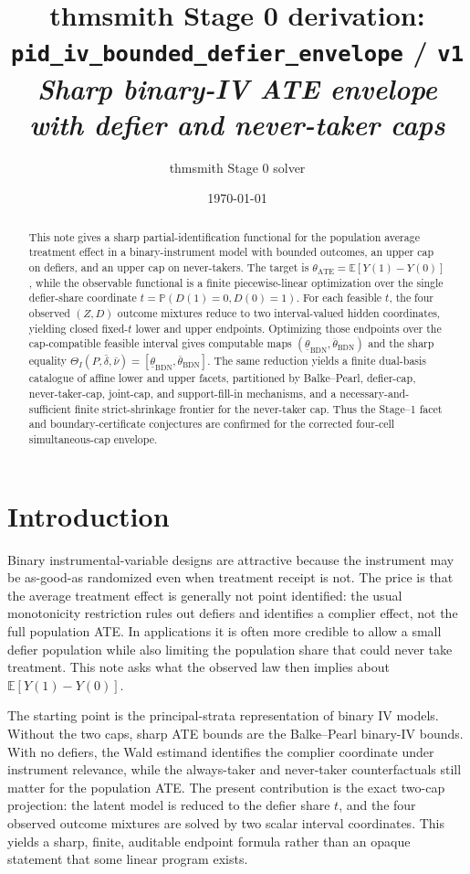 \documentclass[11pt]{article}
\title{thmsmith Stage 0 derivation: \texttt{pid\_iv\_bounded\_defier\_envelope} / \texttt{v1}%
  \\ \large\textit{Sharp binary-IV ATE envelope with defier and never-taker caps}}
\author{thmsmith Stage 0 solver}
\date{\today}
\newcommand{\E}{\mathbb{E}}
\renewcommand{\Pr}{\mathbb{P}}
\theoremstyle{definition}
\theoremstyle{plain}
\theoremstyle{remark}
\begin{document}
\maketitle


\begin{abstract}
This note gives a sharp partial-identification functional for the population
average treatment effect in a binary-instrument model with bounded outcomes,
an upper cap on defiers, and an upper cap on never-takers.  The target is
\(\theta_{\mathrm{ATE}}=\E[Y(1)-Y(0)]\), while the observable functional is a
finite piecewise-linear optimization over the single defier-share coordinate
\(t=\Pr(D(1)=0,D(0)=1)\).  For each feasible \(t\), the four observed
\((Z,D)\) outcome mixtures reduce to two interval-valued hidden coordinates,
yielding closed fixed-\(t\) lower and upper endpoints.  Optimizing those
endpoints over the cap-compatible feasible interval gives computable maps
\((\underline\theta_{\mathrm{BDN}},\overline\theta_{\mathrm{BDN}})\) and the
sharp equality
\(\Theta_I(P,\bar\delta,\bar\nu)=
[\underline\theta_{\mathrm{BDN}},\overline\theta_{\mathrm{BDN}}]\).  The same
reduction yields a finite dual-basis catalogue of affine lower and upper
facets, partitioned by Balke--Pearl, defier-cap, never-taker-cap, joint-cap,
and support-fill-in mechanisms, and a necessary-and-sufficient finite
strict-shrinkage frontier for the never-taker cap.  Thus the Stage--1 facet
and boundary-certificate conjectures are confirmed for the corrected
four-cell simultaneous-cap envelope.
\end{abstract}

\section{Introduction}
Binary instrumental-variable designs are attractive because the instrument may
be as-good-as randomized even when treatment receipt is not.  The price is that
the average treatment effect is generally not point identified: the usual
monotonicity restriction rules out defiers and identifies a complier effect,
not the full population ATE.  In applications it is often more credible to
allow a small defier population while also limiting the population share that
could never take treatment.  This note asks what the observed law then implies
about \(\E[Y(1)-Y(0)]\).

The starting point is the principal-strata representation of binary IV models.
Without the two caps, sharp ATE bounds are the Balke--Pearl binary-IV bounds.
With no defiers, the Wald estimand identifies the complier coordinate under
instrument relevance, while the always-taker and never-taker counterfactuals
still matter for the population ATE.  The present contribution is the exact
two-cap projection: the latent model is reduced to the defier share \(t\), and
the four observed outcome mixtures are solved by two scalar interval
coordinates.  This yields a sharp, finite, auditable endpoint formula rather
than an opaque statement that some linear program exists.
\end{document}
